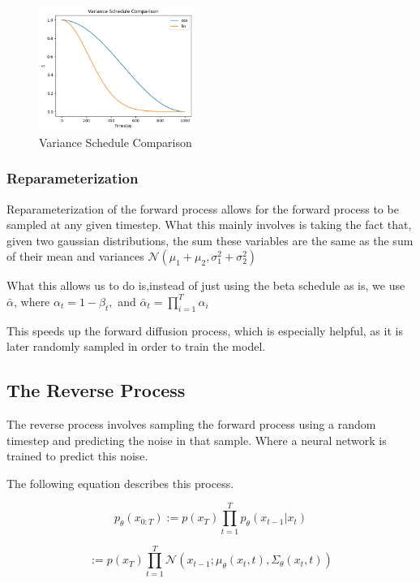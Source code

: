 \documentclass[conference]{IEEEtran}
\begin{document}
\begin{figure}[htbp]
    \centering
    \includegraphics[width=0.45\textwidth]{../images/schedule.png}
    \caption{Variance Schedule Comparison}
    \label{fig:vsc}
\end{figure}

\subsubsection{Reparameterization}

Reparameterization of the forward process allows for the forward process to be
sampled at any given timestep. What this mainly involves is taking the fact
that, given two gaussian distributions, the sum these variables are the same as
the sum of their mean and variances $\mathcal{N}(\mu_{1} + \mu_{2},
    \sigma_{1}^2 +\sigma_{2}^2)$ \cite{nain2022-3}

What this allows us to do is,instead of just using the beta schedule as is, we
use $\bar{\alpha}$, where $\alpha_{t} = 1 - \beta_{t},$ and $\bar{\alpha}_{t} =
    \prod_{i=1}^T \alpha_{i}$

This speeds up the forward diffusion process, which is especially helpful, as
it is later randomly sampled in order to train the model.

\subsection{The Reverse Process}

The reverse process involves sampling the forward process using a random
timestep and predicting the noise in that sample. Where a neural network is
trained to predict this noise.

The following equation describes this process.

$$
    p_{\theta}(x_{0:T})
    := p(x_{T}) \prod_{t=1}^T p_{\theta}(x_{t-1} | x_{t})
$$

$$
    := p(x_{T}) \prod_{t=1}^T \mathcal{N}(x_{t-1}; \mu_{\theta}(x_{t}, t), \Sigma_{\theta}(x_{t}, t))
$$
\end{document}
